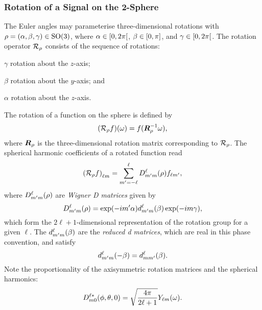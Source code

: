 \subsubsection{Rotation of a Signal on the 2-Sphere}

The Euler angles may parameterise three-dimensional rotations with \(\rho = (\alpha,\beta,\gamma) \in \rotationGroup{}\), where \(\alpha \in \interval[open right]{0}{2\pi}\), \(\beta \in \interval{0}{\pi}\), and \(\gamma \in \interval[open right]{0}{2\pi}\).
The rotation operator \(\rotation{\rho}\) consists of the sequence of rotations:
%
\begin{inparaenum}[(i)]
	\item \({\gamma}\) rotation about the \(z\)-axis;
	\item \({\beta}\) rotation about the \(y\)-axis; and
	\item \({\alpha}\) rotation about the \(z\)-axis.
\end{inparaenum}
%
The rotation of a function on the sphere is defined by
%
\begin{equation}
	\pixel{(\rotation{\rho}f)}
	= f(\vb*{R}_{\rho}^{-1} \omega),
\end{equation}
%
where \(\vb*{R}_{\rho}\) is the three-dimensional rotation matrix corresponding to \(\rotation{\rho}\).
The spherical harmonic coefficients of a rotated function read
%
\begin{equation}\label{eq:chapter2_rotation_matrix}
	\harmonic{(\rotation{\rho}f)}
	= \sum\limits_{m'=-\ell}^{\ell} \wigner{\ell}{m'}{m}(\rho) f_{\ell m'},
\end{equation}
%
where \(\wigner{\ell}{m'}{m}(\rho)\) are \emph{Wigner D matrices} given by
%
\begin{equation}\label{eq:chapter2_reduced_wigner_define}
	\wigner{\ell}{m'}{m}(\rho)
	= \exp(-i m'\alpha) \reducedWigner{\ell}{m'}{m}(\beta) \exp(-i m\gamma),
\end{equation}
%
which form the \(2\ell+1\)-dimensional representation of the rotation group for a given \({\ell}\).
The \(\reducedWigner{\ell}{m'}{m}(\beta)\) are the \emph{reduced d matrices}, which are real in this phase convention, and satisfy
%
\begin{equation}\label{eq:chapter2_reduced_wigner_symmetry}
	\reducedWigner{\ell}{m'}{m}(-\beta)
	= \reducedWigner{\ell}{m}{m'}(\beta).
\end{equation}
%
Note the proportionality of the axisymmetric rotation matrices and the spherical harmonics:
%
\begin{equation}\label{eq:chapter2_wigner_axisymmetric}
	\wigner[\ast]{\ell}{m}{0}(\phi,\theta,0)
	= \sqrt{\inverseFactor} \pixel{\harmonic{Y}}.
\end{equation}

